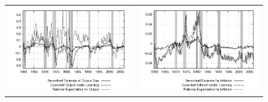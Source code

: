 \begin{figure}[ht]
\begin{center}
\begin{tabular}{cc}
\includegraphics[scale=0.4]{results_cg_wlsinit/output_expre.png} & \includegraphics[scale=0.4]{results_cg_wlsinit/inflation_expre.png} \\
\end{tabular}
\end{center}
\end{figure}

